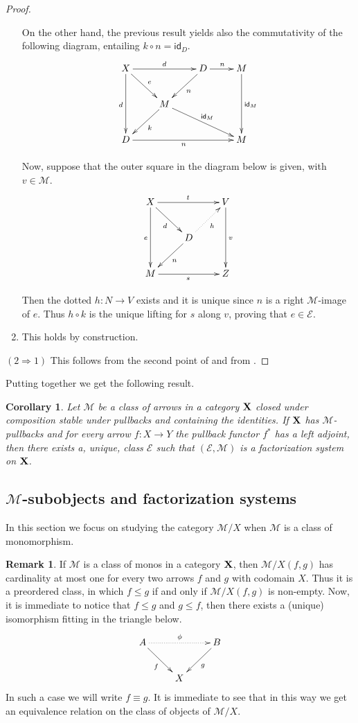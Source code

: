 \documentclass[a4paper]{article}
\newcommand{\id}[1]{\mathsf{id}_{#1}}
\def\D{\textbf {\textup{D}}}
\def\X{\textbf {\textup{X}}}
\newtheorem{corollary}[theorem]{Corollary}
\theoremstyle{definition}
\newtheorem{remark}[theorem]{Remark}
\begin{document}
\begin{proof}
\begin{enumerate}
		On the other hand, the previous result yields also the commutativity of the following diagram, entailing $k\circ n=\id{D}$.
		\[\xymatrix{X \ar[rr]^{d} \ar[dr]^{e}\ar[dd]_{d}& &D \ar[r]^{n}\ar[dl]^{n}& M \ar[dd]^{\id{M}}\\ & M\ar[dl]^{k} \ar[drr]^{\id{M}}\\D\ar[rrr]_{n}&&&M}\]
		
		Now, suppose that the outer square in the diagram below is given, with $v\in \mathcal{M}$.
		\[\xymatrix{X \ar[dd]_{e} \ar[dr]_{d}\ar[rr]^{t}&& V \ar[dd]^{v}\\ & D \ar[dl]^{n} \ar@{.>}[ur]_{h}\\M \ar[rr]_{s}&& Z}\]
		
		Then the dotted $h\colon N\to V$ exists and it is unique since $n$ is a right $\mathcal{M}$-image of  $e$. Thus $h\circ k$ is the unique lifting for $s$ along $v$, proving that $e\in \mathcal{E}$.
		\item This holds by construction.
	\end{enumerate}
	
	\smallskip \noindent $(2\Rightarrow 1)$  This follows from the second point of  and from . \qedhere  
\end{proof}

Putting together  we get the following result.

\begin{corollary}\label{cor:fact}
	Let $\mathcal{M}$ be a class of arrows in a category $\X$ closed under composition stable under pullbacks and containing the identities. If $\X$ has $\mathcal{M}$-pullbacks and for every arrow $f\colon X\to Y$ the pullback functor $f^*$ has a left adjoint, then there exists a, unique, class $\mathcal{E}$ such that $(\mathcal{E}, \mathcal{M})$ is a factorization system on $\X$.
\end{corollary}

\subsection{$\mathcal{M}$-subobjects and factorization systems}\label{app:sub}

In this section we focus on studying the category $\mathcal{M}/X$ when $\mathcal{M}$ is a class of monomorphism.

\begin{remark}
	If  $\mathcal{M}$ is a class of monos in a category $\X$, then $\mathcal{M}/X(f,g)$ has cardinality at most one for every two arrows $f$ and $g$ with codomain $X$. Thus it is a preordered class, in which $f\leq g$ if and only if  $\mathcal{M}/X(f,g)$ is non-empty. Now, it is immediate to notice that $f\leq g$ and $g\leq f$, then there exists a (unique) isomorphism fitting in the triangle below.
	\[\xymatrix{A\ar@{.>}[rr]^{\phi} \ar[dr]_{f} && B \ar[dl]^{g}\\ & X}\]
	In such a case we will write $f\equiv g$. It is immediate to see that in this way we get an equivalence relation on the class of objects of $\mathcal{M}/X$.
\end{remark}
\end{document}

